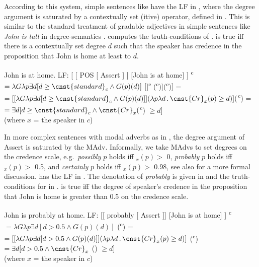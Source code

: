 \documentclass[output=paper,
]{langscibook}
\begin{document}
\noindent According to this system, simple sentences like  have the LF in , where the degree argument is saturated by a contextually set (itive) operator, defined in . This is similar to the standard treatment of gradable adjectives in simple sentences like \textit{John is tall} in degree-semantics \citep[e.g.][]{mcnken05}.  computes the truth-conditions of .  is true iff there is a contextually set degree $d$ such that the speaker has credence in the proposition that John is home at least to $d$. 
     
    \ea \ea John is at home. \label{simplea}
    	 \ex LF: [ [ POS [ Assert ] ] [John is at home] ] \label{simpleb}
         \ex {}\textsuperscript{c} \(= \lambda G\lambda p\exists d[d \geq \cnst{standard}_{c} \wedge G(p)(d)]\) \label{sxpos}
         \ex $\big[$[\textsuperscript{c} (\textsuperscript{c})](\textsuperscript{c})$\big]$ = \\
      	$ = [[\lambda G\lambda p\exists d[d \geq \cnst{standard}_{c}  \wedge G(p)(d)]](\lambda p\lambda d\,.\, \cnst{Cr}_{x}(p) \geq d)]($\textsuperscript{c}) = \\
         $= \exists d[d \geq \cnst{standard}_{c} \wedge \cnst{Cr}_{x}($\textsuperscript{c}) $\geq d ]$  \\
         (where $x$ = the speaker in $c$)	\label{simpled}
    \z \z
 
\noindent In more complex sentences with modal adverbs as in , the degree argument of Assert is saturated by the MAdv. Informally, we take MAdvs to set degrees on the credence scale, e.g.\ \textit{possibly} $p$ holds iff $_{x}(p) >$ 0, \textit{probably} $p$ holds iff $_{x}(p) >$ 0.5, and \textit{certainly} $p$ holds iff $_{x}(p) >$ 0.98, see also \citet{grewol17} for a more formal discussion.  has the LF in . The denotation of \textit{probably} is given in  and the truth-conditions for  in .  is true iff the degree of speaker's credence in the proposition that John is home is greater than 0.5 on the credence scale.  

 
 	\ea \ea John is probably at home. \label{clxa}
    	\ex LF: [[ probably [ Assert ]] [John is at home] ] \label{clxb}
        \ex {}\textsuperscript{c} $= \lambda G\lambda p\exists d[d > 0.5 \wedge G(p)(d)]$ \label{clxc}
         (\textsuperscript{c}) = \\
		 $= [[\lambda G\lambda p\exists d[d > 0.5  \wedge G(p)(d)]](\lambda p\lambda d\,.\, \cnst{Cr}_{x}(p) \geq d)]$ (\textsuperscript{c}) \\
		 $= \exists d[d > 0.5 \wedge \cnst{Cr}_{x}$ () $\geq d]$ \\
       (where $x$ = the speaker in $c$) \label{clxd}
 \z \z
\end{document}
